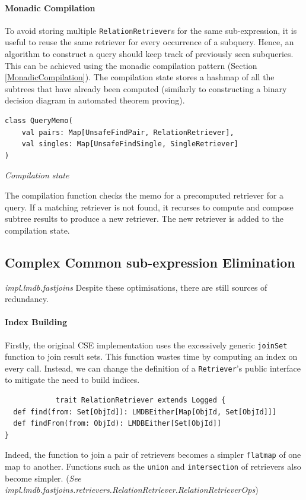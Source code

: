 \documentclass[12pt,a4paper,twoside,openright]{report}
\newcommand\codeName[1]{\texttt{#1}}
\newcommand\note[1]{\textit{#1}}
\renewcommand{\baselinestretch}{1.1}    %
\begin{document}
		
		\paragraph{Monadic Compilation}
		To avoid storing multiple \codeName{RelationRetriever}s for the same sub-expression, it is useful to reuse the same retriever for every occurrence of a subquery. Hence, an algorithm to construct a query should keep track of previously seen subqueries. This can be achieved using the monadic compilation pattern (Section \ref{MonadicCompilation}). The compilation state stores a hashmap of all the subtrees that have already been computed (similarly to constructing a binary decision diagram in automated theorem proving). 
		
\renewcommand{\baselinestretch}{0.8}
\begin{framed}
\begin{verbatim}
class QueryMemo(
    val pairs: Map[UnsafeFindPair, RelationRetriever], 
    val singles: Map[UnsafeFindSingle, SingleRetriever]
)
\end{verbatim}
\note{Compilation state}
\end{framed}
\renewcommand{\baselinestretch}{1.1}

		The compilation function checks the memo for a precomputed retriever for a query. If a matching retriever is not found, it recurses to compute and compose subtree results to produce a new retriever. The new retriever is added to the compilation state.
		
	\subsection{Complex Common sub-expression Elimination}
	\note{impl.lmdb.fastjoins}
Despite these optimisations, there are still sources of redundancy.

		\paragraph{Index Building}
			Firstly, the original CSE implementation uses the excessively generic \codeName{joinSet} function to join result sets. This function wastes time by computing an index on every call. Instead, we can change the definition of a \codeName{Retriever}'s public interface to mitigate the need to build indices.
			\renewcommand{\baselinestretch}{0.8}
			\begin{framed}
			\begin{verbatim}
			trait RelationRetriever extends Logged {
  def find(from: Set[ObjId]): LMDBEither[Map[ObjId, Set[ObjId]]]
  def findFrom(from: ObjId): LMDBEither[Set[ObjId]]
}
			\end{verbatim}
			\end{framed}
			\renewcommand{\baselinestretch}{1.1}
			Indeed, the function to join a pair of retrievers becomes a simpler \codeName{flatmap} of one map to another. Functions such as the \codeName{union} and \codeName{intersection} of retrievers also become simpler. (\note{See impl.lmdb.fastjoins.retrievers.RelationRetriever.RelationRetrieverOps})
\end{document}
